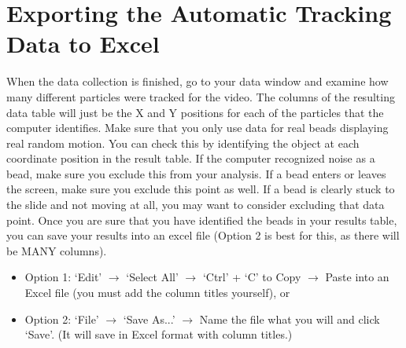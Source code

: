 \section*{Exporting the Automatic Tracking Data to Excel}
When the data collection is finished, go to your data window and examine how many different particles were tracked for the video. 
The columns of the resulting data table will just be the X and Y positions for each of the particles that the computer identifies. 
Make sure that you only use data for real beads displaying real random motion. 
You can check this by identifying the object at each coordinate position in the result table. 
If the computer recognized noise as a bead, make sure you exclude this from your analysis. 
If a bead enters or leaves the screen, make sure you exclude this point as well. 
If a bead is clearly stuck to the slide and not moving at all, you may want to consider excluding that data point. 
Once you are sure that you have identified the beads in your results table, you can save your results into an excel file (Option 2 is best for this, as there will be MANY columns).
\begin{itemize}
\item Option 1: `Edit' $\rightarrow$ `Select All' $\rightarrow$ `Ctrl' + `C' to Copy $\rightarrow$ Paste into an Excel file (you must add the column titles yourself), or
\item Option 2: `File' $\rightarrow$ `Save As...' $\rightarrow$ Name the file what you will and click `Save'. (It will save in Excel format with column titles.)
\end{itemize}